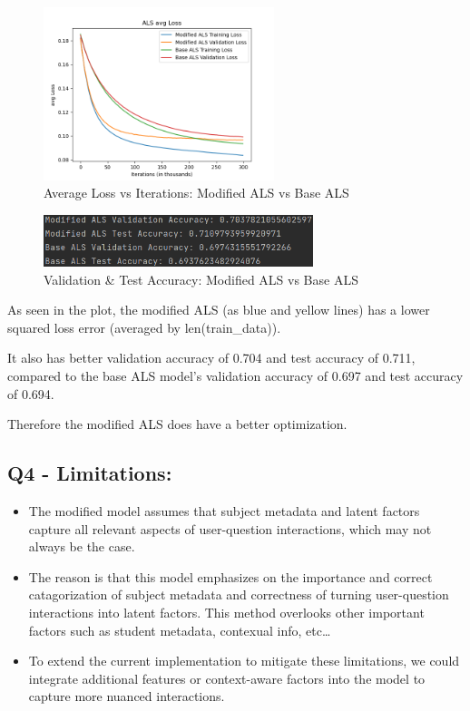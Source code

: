\documentclass{article}
\begin{document}
\begin{figure}[H]
    \centering
    \includegraphics[width=0.6\textwidth]{bz1.png}
    \caption{Average Loss vs Iterations: Modified ALS vs Base ALS}
\end{figure}

\begin{figure}[H]
    \centering
    \includegraphics[width=0.7\textwidth]{bz2.png}
    \caption{Validation \& Test Accuracy: Modified ALS vs Base ALS}
\end{figure}
As seen in the plot, the modified ALS (as blue and yellow lines) has a lower squared loss error (averaged by len(train\_data)).

It also has better validation accuracy of 0.704 and test accuracy of 0.711, compared to the base ALS model's validation accuracy of 0.697 and test accuracy of 0.694.

Therefore the modified ALS does have a better optimization.

\subsection*{Q4 - Limitations:}
\begin{itemize}
    \item The modified model assumes that subject metadata and latent factors capture all relevant aspects of user-question interactions, which may not always be the case.
    \item The reason is that this model emphasizes on the importance and correct catagorization of subject metadata and correctness of turning user-question interactions into latent factors. This method overlooks other important factors such as student metadata, contexual info, etc\dots
    \item To extend the current implementation to mitigate these limitations, we could integrate additional features or context-aware factors into the model to capture more nuanced interactions.
\end{itemize}
\newpage
\end{document}
